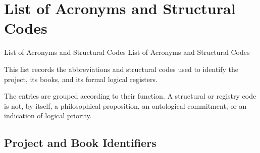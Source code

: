 %
%
%
%
%
%



\chapter*{List of Acronyms and Structural Codes}

\markboth
    {List of Acronyms and Structural Codes}
    {List of Acronyms and Structural Codes}


This list records the abbreviations and structural codes used to identify
the project, its books, and its formal logical registers.

The entries are grouped according to their function. A structural or
registry code is not, by itself, a philosophical proposition, an
ontological commitment, or an indication of logical priority.



\section*{Project and Book Identifiers}

